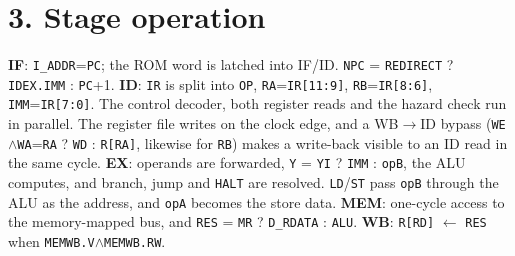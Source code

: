 \documentclass[10pt,a4paper]{article}
\begin{document}
\section*{3. Stage operation}
\textbf{IF}: \texttt{I\_ADDR}=\texttt{PC}; the ROM word is latched into IF/ID. \texttt{NPC} = \texttt{REDIRECT} ?
\texttt{IDEX.IMM} : \texttt{PC}+1. \textbf{ID}: \texttt{IR} is split into \texttt{OP}, \texttt{RA}=\texttt{IR[11:9]},
\texttt{RB}=\texttt{IR[8:6]}, \texttt{IMM}=\texttt{IR[7:0]}. The control decoder, both register reads and the hazard check
run in parallel. The register file writes on the clock edge, and a WB$\rightarrow$ID bypass
(\texttt{WE}$\wedge$\texttt{WA}=\texttt{RA} ? \texttt{WD} : \texttt{R[RA]}, likewise for \texttt{RB}) makes a write-back
visible to an ID read in the same cycle. \textbf{EX}: operands are forwarded, \texttt{Y} = \texttt{YI} ? \texttt{IMM} :
\texttt{opB}, the ALU computes, and branch, jump and \texttt{HALT} are resolved. \texttt{LD}/\texttt{ST} pass \texttt{opB}
through the ALU as the address, and \texttt{opA} becomes the store data. \textbf{MEM}: one-cycle access to the
memory-mapped bus, and \texttt{RES} = \texttt{MR} ? \texttt{D\_RDATA} : \texttt{ALU}. \textbf{WB}: \texttt{R[RD]}
$\leftarrow$ \texttt{RES} when \texttt{MEMWB.V}$\wedge$\texttt{MEMWB.RW}.
\end{document}
